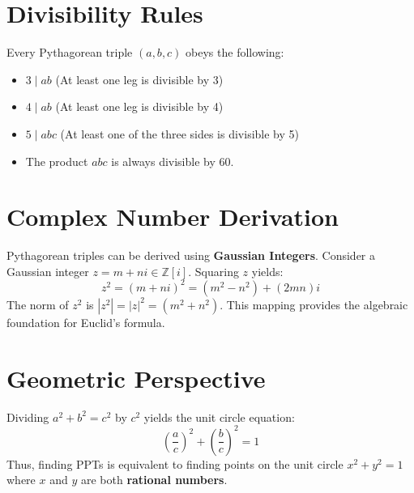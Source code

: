 \documentclass[12pt]{article}
\begin{document}
\section{Divisibility Rules}
Every Pythagorean triple $(a, b, c)$ obeys the following:
\begin{itemize}
    \item $3 \mid ab$ (At least one leg is divisible by 3)
    \item $4 \mid ab$ (At least one leg is divisible by 4)
    \item $5 \mid abc$ (At least one of the three sides is divisible by 5)
    \item The product $abc$ is always divisible by 60.
\end{itemize}

\section{Complex Number Derivation}
Pythagorean triples can be derived using \textbf{Gaussian Integers}. Consider a Gaussian integer $z = m + ni \in \mathbb{Z}[i]$. Squaring $z$ yields:
\begin{equation}
    z^2 = (m + ni)^2 = (m^2 - n^2) + (2mn)i
\end{equation}
The norm of $z^2$ is $|z^2| = |z|^2 = (m^2 + n^2)$. This mapping provides the algebraic foundation for Euclid's formula.

\section{Geometric Perspective}
Dividing $a^2 + b^2 = c^2$ by $c^2$ yields the unit circle equation:
\begin{equation}
    \left(\frac{a}{c}\right)^2 + \left(\frac{b}{c}\right)^2 = 1
\end{equation}
Thus, finding PPTs is equivalent to finding points on the unit circle $x^2 + y^2 = 1$ where $x$ and $y$ are both \textbf{rational numbers}.
\end{document}

